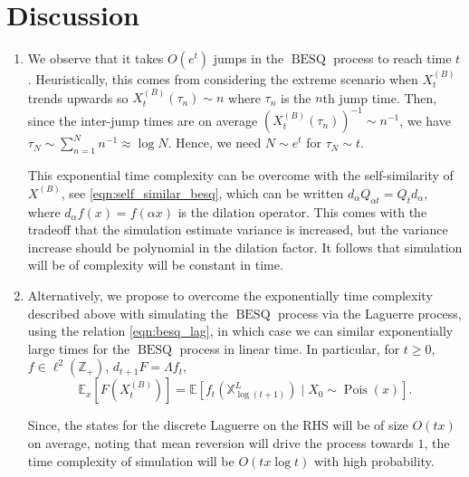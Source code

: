 \documentclass[11pt,a4,reqno]{amsart}
\numberwithin{equation}{section}
\theoremstyle{definition}
\theoremstyle{remark}
\newcommand{\bb}[1]{\mathbb{#1}}
\newcommand{\E}{\bb{E}}
\newcommand{\Z}{\bb{Z}}
\DeclareMathOperator{\besq}{BESQ}
\DeclareMathOperator{\pois}{Pois}
\newcommand{\beq}{\begin{equation}}
\newcommand{\eeq}{\end{equation}}
\begin{document}
	
\section{Discussion}

	\begin{enumerate}
		\item \label{bessel_self_similar} We observe that it takes $O(e^t)$ jumps in the $\besq$ process to reach time $t$. Heuristically, this comes from considering the extreme scenario when $X_t^{(B)}$ trends upwards so $X_t^{(B)}(\tau_n) \sim n$ where $\tau_n$ is the $n$th jump time. Then, since the inter-jump times are on average $(X_t^{(B)}(\tau_n))^{-1} \sim n^{-1}$, we have $\tau_N \sim \sum_{n = 1}^N n^{-1} \approx \log N$. Hence, we need $N \sim e^t$ for $\tau_N \sim t$. 
		
		This exponential time complexity can be overcome with the self-similarity of $X^{(B)}$, see \eqref{eqn:self_similar_besq}, which can be written $d_{\alpha} Q_{\alpha t} = Q_{t} d_\alpha$, where $d_\alpha f(x) = f(\alpha x)$ is the dilation operator. This comes with the tradeoff that the simulation estimate variance is increased, but the variance increase should be polynomial in the dilation factor. It follows that simulation will be of complexity will be constant in time. 
		
		\item \label{lag_connection} Alternatively, we propose to overcome the exponentially time complexity described above with simulating the $\besq$ process via the Laguerre process, using the relation \eqref{eqn:besq_lag}, in which case we can similar exponentially large times for the $\besq$ process in linear time. In particular, for $t \geq  0$, $f \in \ell^2(\Z_+)$, $d_{t + 1}F = \Lambda f_t$,
			\beq \E_x[F(X_t^{(B)})] = \E[f_t(\bb{X}^{L}_{\log (t + 1)}) \mid X_0 \sim \pois(x)] . \eeq
			
			Since, the states for the discrete Laguerre on the RHS will be of size $O(tx)$ on average, noting that mean reversion will drive the process towards $1$, the time complexity of simulation will be $O(tx \log t)$ with high probability. 
		
			
		

	\end{enumerate}
	



\end{document}
